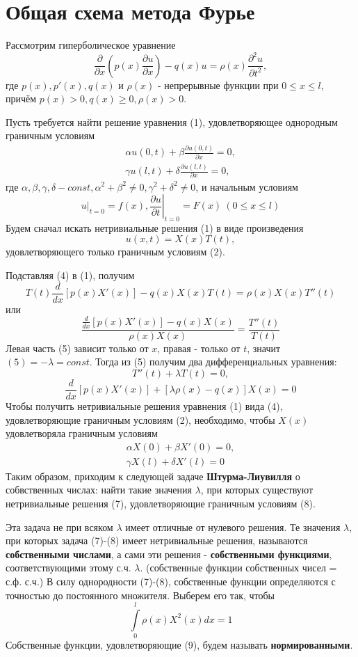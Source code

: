 \section{Общая схема метода Фурье}
Рассмотрим гиперболическое уравнение
\[
	\frac{\partial}{\partial x} \left( p(x) \frac{\partial u}{\partial x}\right) - q(x) u = \rho(x) \frac{\partial^2 u}{\partial t^2},
\]
где $p(x), p'(x), q(x)$ и $\rho(x)$ - непрерывные функции при $0 \le x \le l$, причём $p(x) > 0, q(x) \ge 0, \rho(x) > 0$.

Пусть требуется найти решение уравнения (1), удовлетворяющее однородным граничным условиям
\[
	\begin{aligned}
		\alpha u(0,t) + \beta \frac{\partial u(0,t)}{\partial x} = 0, \\
		\gamma u(l,t) + \delta \frac{\partial u(l,t)}{\partial x} = 0,
	\end{aligned}
	\tag{2}
\]
где $\alpha, \beta, \gamma, \delta - const, \alpha^2 + \beta^2 \ne 0, \gamma^2 + \delta^2 \ne 0$, и начальным условиям
\[
	\left. u \right|_{t=0} = f(x), \left. \frac{\partial u}{\partial t}\right|_{t=0} = F(x) ~ (0 \le x \le l)
\]
Будем сначал искать нетривиальные решения (1) в виде произведения
\[
	u(x, t) = X(x) T(t), \tag{4}
\]
удовлетворяющего только граничным условиям (2).

Подставляя (4) в (1), получим
\[
	T(t) \frac{d}{dx} \left[ p(x) X'(x)\right] - q(x) X(x) T(t) = \rho(x) X(x) T''(t)
\]
или
\[
	\frac{\frac{d}{dx} \left[ p(x) X'(x)\right] - q(x) X(x)}{\rho(x) X(x)} = \frac{T''(t)}{T(t)} \tag{5}
\]
Левая часть (5) зависит только от $x$, правая - только от $t$, значит $(5) = -\lambda = const$. Тогда из (5) получим два дифференциальных уравнения:
\[
	T''(t) + \lambda T(t) = 0, \tag{6}
\]
\[
	\frac{d}{dx} \left[ p(x) X'(x) \right] + \left[ \lambda \rho(x) - q(x) \right] X(x) = 0 \tag{7}
\]
Чтобы получить нетривиальные решения уравнения (1) вида (4), удовлетворяющие граничным условиям (2), необходимо, чтобы $X(x)$ удовлетворяла граничным условиям
\[
	\begin{aligned}
		\alpha X(0) + \beta X'(0) = 0, \\
		\gamma X(l) + \delta X'(l) = 0 
	\end{aligned} \tag{8}
\]
Таким образом, приходим к следующей задаче \textbf{Штурма-Лиувилля} о собвственных числах: найти такие значения $\lambda$, при которых существуют нетривиальные решения (7), удовлетворяющие граничным условиям (8).

Эта задача не при всяком $\lambda$ имеет отличные от нулевого решения. Те значения $\lambda$, при которых задача (7)-(8) имеет нетривиальные решения, называются \textbf{собственными числами}, а сами эти решения - \textbf{собственными функциями}, соответствующими этому с.ч. $\lambda$. (собственные функции собственных чисел = с.ф. с.ч.) В силу однородности (7)-(8), собственные функции определяются с точностью до постоянного множителя. Выберем его так, чтобы
\[
	\int\limits_0^l \rho(x) X^2(x) dx = 1 \tag{9}
\]
Собственные функции, удовлетворяющие (9), будем называть \textbf{нормированными}.

